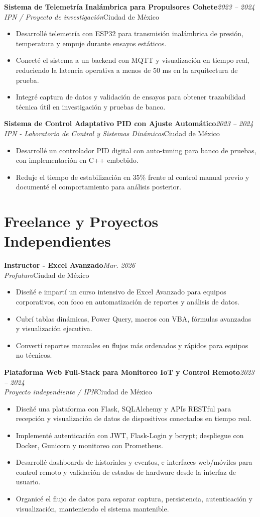 \documentclass[10pt,a4paper]{article}
\newcommand{\resumeItem}[1]{\item\small #1}
\newcommand{\resumeSubheading}[4]{%
  \vspace{3pt}\noindent
  \textbf{#1}\hfill{\small\textit{\color{graytext}#2}}\\
  \textit{\color{graytext}#3}\hfill{\small\color{graytext}#4}\vspace{2pt}
}
\newcommand{\resumeItemListStart}{\begin{itemize}[leftmargin=1.15em,itemsep=1.5pt,topsep=2pt,partopsep=0pt,parsep=0pt]}
\newcommand{\resumeItemListEnd}{\end{itemize}\vspace{2pt}}
\begin{document}
\resumeSubheading
{Sistema de Telemetr\'ia Inal\'ambrica para Propulsores Cohete}{2023 -- 2024}
{IPN / Proyecto de investigaci\'on}{Ciudad de M\'exico}
\resumeItemListStart
  \resumeItem{Desarroll\'e telemetr\'ia con ESP32 para transmisi\'on inal\'ambrica de presi\'on, temperatura y empuje durante ensayos est\'aticos.}
  \resumeItem{Conect\'e el sistema a un backend con MQTT y visualizaci\'on en tiempo real, reduciendo la latencia operativa a menos de 50 ms en la arquitectura de prueba.}
  \resumeItem{Integr\'e captura de datos y validaci\'on de ensayos para obtener trazabilidad t\'ecnica \'util en investigaci\'on y pruebas de banco.}
\resumeItemListEnd

\resumeSubheading
{Sistema de Control Adaptativo PID con Ajuste Autom\'atico}{2023 -- 2024}
{IPN - Laboratorio de Control y Sistemas Din\'amicos}{Ciudad de M\'exico}
\resumeItemListStart
  \resumeItem{Desarroll\'e un controlador PID digital con auto-tuning para banco de pruebas, con implementaci\'on en C++ embebido.}
  \resumeItem{Reduje el tiempo de estabilizaci\'on en 35\% frente al control manual previo y document\'e el comportamiento para an\'alisis posterior.}
\resumeItemListEnd

\section{Freelance y Proyectos Independientes}

\resumeSubheading
{Instructor - Excel Avanzado}{Mar. 2026}
{Profuturo}{Ciudad de M\'exico}
\resumeItemListStart
  \resumeItem{Dise\~n\'e e impart\'i un curso intensivo de Excel Avanzado para equipos corporativos, con foco en automatizaci\'on de reportes y an\'alisis de datos.}
  \resumeItem{Cubr\'i tablas din\'amicas, Power Query, macros con VBA, f\'ormulas avanzadas y visualizaci\'on ejecutiva.}
  \resumeItem{Convert\'i reportes manuales en flujos m\'as ordenados y r\'apidos para equipos no t\'ecnicos.}
\resumeItemListEnd

\resumeSubheading
{Plataforma Web Full-Stack para Monitoreo IoT y Control Remoto}{2023 -- 2024}
{Proyecto independiente / IPN}{Ciudad de M\'exico}
\resumeItemListStart
  \resumeItem{Dise\~n\'e una plataforma con Flask, SQLAlchemy y APIs RESTful para recepci\'on y visualizaci\'on de datos de dispositivos conectados en tiempo real.}
  \resumeItem{Implement\'e autenticaci\'on con JWT, Flask-Login y bcrypt; despliegue con Docker, Gunicorn y monitoreo con Prometheus.}
  \resumeItem{Desarroll\'e dashboards de historiales y eventos, e interfaces web/m\'oviles para control remoto y validaci\'on de estados de hardware desde la interfaz de usuario.}
  \resumeItem{Organic\'e el flujo de datos para separar captura, persistencia, autenticaci\'on y visualizaci\'on, manteniendo el sistema mantenible.}
\resumeItemListEnd
\end{document}
